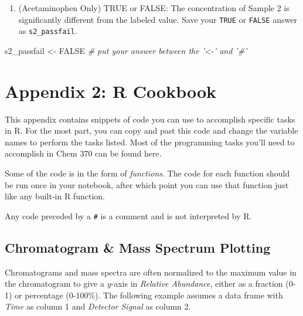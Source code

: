 \documentclass[]{tufte-book}
\newenvironment{Shaded}{}{}
\newcommand{\CommentTok}[1]{\textcolor[rgb]{0.38,0.63,0.69}{\textit{#1}}}
\newcommand{\NormalTok}[1]{#1}
\newcommand{\OtherTok}[1]{\textcolor[rgb]{0.00,0.44,0.13}{#1}}
\newcommand{\StringTok}[1]{\textcolor[rgb]{0.25,0.44,0.63}{#1}}
\providecommand{\tightlist}{%
  \setlength{\itemsep}{0pt}\setlength{\parskip}{0pt}}
\begin{document}
\begin{enumerate}
\def\labelenumi{\arabic{enumi}.}
\setcounter{enumi}{10}
\tightlist
\item
  (Acetaminophen Only) TRUE or FALSE: The concentration of Sample 2 is significantly different from the labeled value. Save your \texttt{TRUE} or \texttt{FALSE} answer as \texttt{s2\_passfail}.
\end{enumerate}

\begin{Shaded}
\begin{Highlighting}[]
\NormalTok{s2_passfail <-}\StringTok{ }\OtherTok{FALSE}     \CommentTok{# put your answer between the '<-' and '#'}
\end{Highlighting}
\end{Shaded}

\hypertarget{appendix-2-r-cookbook}{%
\chapter*{Appendix 2: R Cookbook}\label{appendix-2-r-cookbook}}

This appendix contains snippets of code you can use to accomplish specific tasks in R. For the most part, you can copy and past this code and change the variable names to perform the tasks listed. Most of the programming tasks you'll need to accomplish in Chem 370 can be found here.

Some of the code is in the form of \emph{functions}. The code for each function should be run once in your notebook, after which point you can use that function just like any built-in R function.

Any code preceded by a \texttt{\#} is a comment and is not interpreted by R.

\hypertarget{chromatogram-mass-spectrum-plotting}{%
\section*{Chromatogram \& Mass Spectrum Plotting}\label{chromatogram-mass-spectrum-plotting}}

Chromatograms and mass spectra are often normalized to the maximum value in the chromatogram to give a \(y\)-axis in \emph{Relative Abundance}, either as a fraction (0-1) or percentage (0-100\%). The following example assumes a data frame with \emph{Time} as column 1 and \emph{Detector Signal} as column 2.
\end{document}
